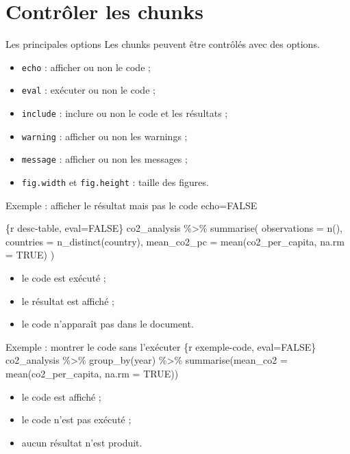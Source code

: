 \documentclass[
  10pt,
  ignorenonframetext,
]{beamer}
\providecommand{\tightlist}{%
  \setlength{\itemsep}{0pt}\setlength{\parskip}{0pt}}
\begin{document}
\section{Contrôler les chunks}\label{contruxf4ler-les-chunks}

\begin{frame}{Les principales options}
\label{les-principales-options}
Les chunks peuvent être contrôlés avec des options.

\begin{itemize}
  \item \texttt{echo} : afficher ou non le code ;
  \item \texttt{eval} : exécuter ou non le code ;
  \item \texttt{include} : inclure ou non le code et les résultats ;
  \item \texttt{warning} : afficher ou non les warnings ;
  \item \texttt{message} : afficher ou non les messages ;
  \item \texttt{fig.width} et \texttt{fig.height} : taille des figures.
\end{itemize}
\end{frame}

\begin{frame}{Exemple : afficher le résultat mais pas le code}
\label{exemple-afficher-le-ruxe9sultat-mais-pas-le-code}
echo=FALSE

\{r desc-table, eval=FALSE\} co2\_analysis \%\textgreater\% summarise(
observations = n(), countries = n\_distinct(country), mean\_co2\_pc =
mean(co2\_per\_capita, na.rm = TRUE) )

\begin{itemize}
\tightlist
\item
  le code est exécuté ;
\item
  le résultat est affiché ;
\item
  le code n'apparaît pas dans le document.
\end{itemize}
\end{frame}

\begin{frame}{Exemple : montrer le code sans l'exécuter}
\label{exemple-montrer-le-code-sans-lexuxe9cuter}
\{r exemple-code, eval=FALSE\} co2\_analysis \%\textgreater\%
group\_by(year) \%\textgreater\% summarise(mean\_co2 =
mean(co2\_per\_capita, na.rm = TRUE))

\begin{itemize}
\tightlist
\item
  le code est affiché ;
\item
  le code n'est pas exécuté ;
\item
  aucun résultat n'est produit.
\end{itemize}
\end{frame}
\end{document}
